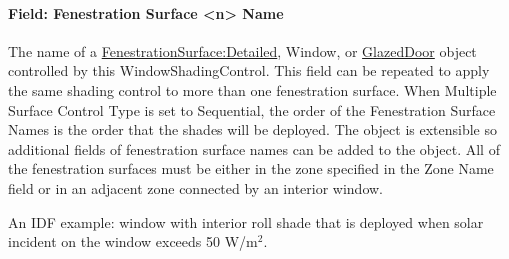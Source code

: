 \paragraph{Field: Fenestration Surface <n> Name}\label{field-fenestration-surface1-name}

The name of a \hyperref[fenestrationsurfacedetailed]{FenestrationSurface:Detailed}, Window, or \hyperref[glazeddoor]{GlazedDoor} object controlled by this WindowShadingControl. This field can be repeated to apply the same shading control to more than one fenestration surface. When Multiple Surface Control Type is set to Sequential, the order of the Fenestration Surface Names is the order that the shades will be deployed. The object is extensible so additional fields of fenestration surface names can be added to the object. All of the fenestration surfaces must be either in the zone specified in the Zone Name field or in an adjacent zone connected by an interior window.

An IDF example: window with interior roll shade that is deployed when solar incident on the window exceeds 50 W/m\(^{2}\).

